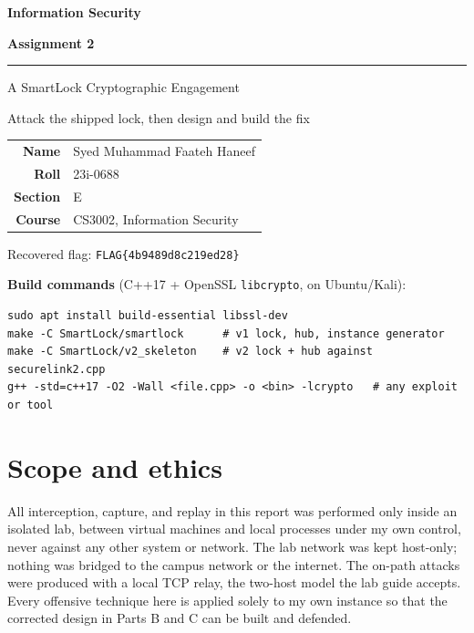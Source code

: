 \documentclass[11pt,a4paper]{article}
\begin{document}
\begin{titlepage}
\centering
\vspace*{\fill}
{\Huge\bfseries Information Security\par}
\vspace{16pt}
{\Huge\bfseries Assignment 2\par}
\vspace{26pt}
\rule{0.42\linewidth}{1pt}\par
\vspace{26pt}
{\LARGE A SmartLock Cryptographic Engagement\par}
\vspace{12pt}
{\large Attack the shipped lock, then design and build the fix\par}
\vspace*{\fill}
{\Large
\renewcommand{\arraystretch}{1.5}
\begin{tabular}{rl}
\textbf{Name} & Syed Muhammad Faateh Haneef\\
\textbf{Roll} & 23i-0688\\
\textbf{Section} & E\\
\textbf{Course} & CS3002, Information Security\\
\end{tabular}\par}
\vspace{26pt}
{\large Recovered flag: \texttt{FLAG\{4b9489d8c219ed28\}}\par}
\vspace{30pt}
\begin{minipage}{0.88\linewidth}
\footnotesize\textbf{Build commands} (C++17 + OpenSSL \texttt{libcrypto}, on Ubuntu/Kali):
\begin{lstlisting}
sudo apt install build-essential libssl-dev
make -C SmartLock/smartlock      # v1 lock, hub, instance generator
make -C SmartLock/v2_skeleton    # v2 lock + hub against securelink2.cpp
g++ -std=c++17 -O2 -Wall <file.cpp> -o <bin> -lcrypto   # any exploit or tool
\end{lstlisting}
\end{minipage}
\vspace*{\fill}
\end{titlepage}

\tableofcontents
\newpage

\section{Scope and ethics}
All interception, capture, and replay in this report was performed only inside an
isolated lab, between virtual machines and local processes under my own control,
never against any other system or network. The lab network was kept host-only;
nothing was bridged to the campus network or the internet. The on-path attacks were
produced with a local TCP relay, the two-host model the lab guide accepts. Every
offensive technique here is applied solely to my own instance so that the corrected
design in Parts B and C can be built and defended.
\end{document}
